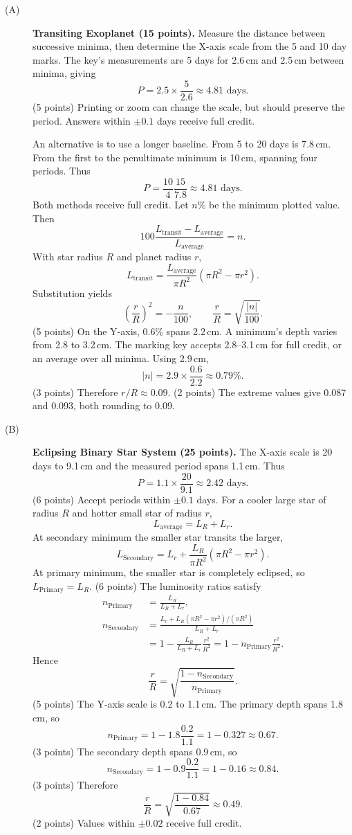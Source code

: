 \begin{description}
\item[(A)] \textbf{Transiting Exoplanet (15 points).} 
Measure the distance between successive minima, then determine the X-axis scale from the 5 and 10 day marks. The key's measurements are 5 days for 2.6\,cm and 2.5\,cm between minima, giving
\[
P=2.5\times\frac5{2.6}\approx4.81\text{ days}.
\]\hfill(5 points)
Printing or zoom can change the scale, but should preserve the period. Answers within $\pm0.1$ days receive full credit.

An alternative is to use a longer baseline. From 5 to 20 days is 7.8\,cm. From the first to the penultimate minimum is 10\,cm, spanning four periods. Thus
\[
P=\frac{10}{4}\frac{15}{7.8}\approx4.81\text{ days}.
\]
Both methods receive full credit. Let $n\%$ be the minimum plotted value. Then
\[
100\frac{L_{\mathrm{transit}}-L_{\mathrm{average}}}{L_{\mathrm{average}}}=n.
\]
With star radius $R$ and planet radius $r$,
\[
L_{\mathrm{transit}}=\frac{L_{\mathrm{average}}}{\pi R^2}(\pi R^2-\pi r^2).
\]
Substitution yields
\[
\left(\frac rR\right)^2=-\frac n{100},\qquad\frac rR=\sqrt{\frac{|n|}{100}}.
\]\hfill(5 points)
On the Y-axis, 0.6\% spans 2.2\,cm. A minimum's depth varies from 2.8 to 3.2\,cm. The marking key accepts 2.8--3.1\,cm for full credit, or an average over all minima. Using 2.9\,cm,
\[
|n|=2.9\times\frac{0.6}{2.2}\approx0.79\%.
\]\hfill(3 points)
Therefore $r/R\approx0.09$. \hfill(2 points)
The extreme values give 0.087 and 0.093, both rounding to 0.09.
\item[(B)] \textbf{Eclipsing Binary Star System (25 points).} The X-axis scale is 20 days to 9.1\,cm and the measured period spans 1.1\,cm. Thus
\[
P=1.1\times\frac{20}{9.1}\approx2.42\text{ days}.
\]\hfill(6 points)
Accept periods within $\pm0.1$ days. For a cooler large star of radius $R$ and hotter small star of radius $r$,
\[
L_{\mathrm{average}}=L_R+L_r.
\]
At secondary minimum the smaller star transits the larger,
\[
L_{\mathrm{Secondary}}=L_r+\frac{L_R}{\pi R^2}(\pi R^2-\pi r^2).
\]
At primary minimum, the smaller star is completely eclipsed, so $L_{\mathrm{Primary}}=L_R$. \hfill(6 points)
The luminosity ratios satisfy
\begin{align*}
n_{\mathrm{Primary}}&=\frac{L_R}{L_R+L_r},\\
n_{\mathrm{Secondary}}&=\frac{L_r+L_R(\pi R^2-\pi r^2)/(\pi R^2)}{L_R+L_r}\\
&=1-\frac{L_R}{L_R+L_r}\frac{r^2}{R^2}=1-n_{\mathrm{Primary}}\frac{r^2}{R^2}.
\end{align*}
Hence
\[
\frac rR=\sqrt{\frac{1-n_{\mathrm{Secondary}}}{n_{\mathrm{Primary}}}}.
\]\hfill(5 points)
The Y-axis scale is 0.2 to 1.1\,cm. The primary depth spans 1.8\,cm, so
\[
n_{\mathrm{Primary}}=1-1.8\frac{0.2}{1.1}=1-0.327\approx0.67.
\]\hfill(3 points)
The secondary depth spans 0.9\,cm, so
\[
n_{\mathrm{Secondary}}=1-0.9\frac{0.2}{1.1}=1-0.16\approx0.84.
\]\hfill(3 points)
Therefore
\[
\frac rR=\sqrt{\frac{1-0.84}{0.67}}\approx0.49.
\]\hfill(2 points)
Values within $\pm0.02$ receive full credit.
\end{description}
